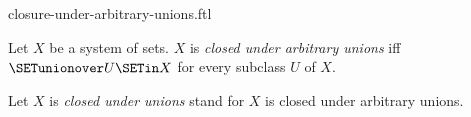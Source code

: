 \documentclass{stex}
\begin{document}
\begin{smodule}{closure-under-arbitrary-unions.ftl}

\begin{definition}[forthel,id=FOUNDATIONS_14_3959378992431104]
  Let $X$ be a system of sets.
  $X$ is \emph{closed under arbitrary unions} iff $\SETunionover U \SETin X$ for every  subclass $U$ of $X$.

  Let $X$ is \emph{closed under unions} stand for $X$ is closed under arbitrary unions.
\end{definition}
\end{smodule}
\end{document}
